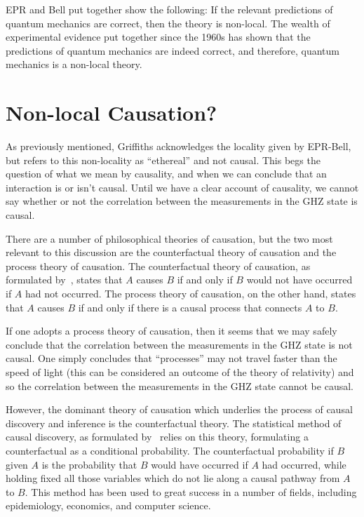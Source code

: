 \documentclass[11pt, a4paper]{article}
\begin{document}
EPR and Bell put together show the following: If the relevant predictions of 
quantum mechanics are correct, then the theory is non-local. The wealth of 
experimental evidence put together since the 1960s has shown that the predictions
of quantum mechanics are indeed correct, and therefore, quantum mechanics is a
non-local theory.

\section{Non-local Causation?}

As previously mentioned, Griffiths acknowledges the locality given by EPR-Bell, 
but refers to this non-locality as ``ethereal'' and not causal. This begs the
question of what we mean by causality, and when we can conclude that an
interaction is or isn't causal. Until we have a clear account of causality, we 
cannot say whether or not the correlation between the measurements in the GHZ
state is causal.

There are a number of philosophical theories of causation, but the two most
relevant to this discussion are the counterfactual theory of causation and the
process theory of causation. The counterfactual theory of causation, as
formulated by~\cite{Lewis_1973}, states that $A$ causes $B$ if and only if $B$
would not have occurred if $A$ had not occurred. The process theory of
causation, on the other hand, states that $A$ causes $B$ if and only if there is
a causal process that connects $A$ to $B$.

If one adopts a process theory of causation, then it seems that we may safely 
conclude that the correlation between the measurements in the GHZ state is not
causal. One simply concludes that ``processes'' may not travel faster than the
speed of light (this can be considered an outcome of the theory of relativity)
and so the correlation between the measurements in the GHZ state cannot be
causal.

However, the dominant theory of causation which underlies the process of causal 
discovery and inference is the counterfactual theory. The statistical method of
causal discovery, as formulated by~\cite{Pearl_1995} relies on this theory, 
formulating a counterfactual as a conditional probability. The counterfactual
probability if $B$ given $A$ is the probability that $B$ would have occurred if
$A$ had occurred, while holding fixed all those variables which do not lie along
a causal pathway from $A$ to $B$. This method has been used to great success in
a number of fields, including epidemiology, economics, and computer science.
\end{document}
